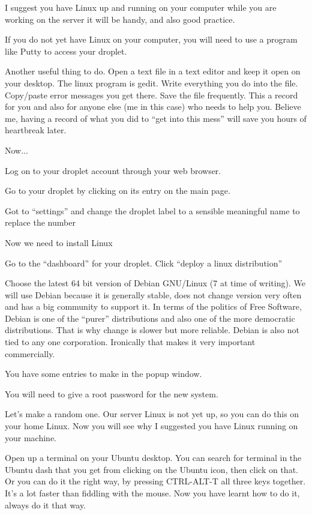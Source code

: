 \documentclass[12pt,a4paper]{article}
\begin{document}
I suggest you have Linux up and running on your computer while you are working on the server  it will be handy, and also good practice.

If you do not yet have Linux on your computer, you will need to use a program like Putty to access your droplet.

Another useful thing to do. Open a text file in a text editor and keep it open on your desktop. The linux program is gedit. Write everything you do into the file. Copy/paste error messages you get there. Save the file frequently. This a record for you and also for anyone else (me in this case) who needs to help you. Believe me, having a record of what you did to “get into this mess” will save you hours of heartbreak later. 

Now...

Log on to your droplet account through your web browser.

Go to your droplet by clicking on its entry on the main page.

Got to “settings” and change the droplet label to a sensible meaningful name to replace the number

Now we need to install Linux 

Go to the “dashboard” for your droplet. Click “deploy a linux distribution”

Choose the latest 64 bit version of Debian GNU/Linux (7 at time of writing). We will use Debian because it is generally stable, does not change version very often and has a big community to support it.  In terms of the politics of Free Software, Debian is one of the “purer” distributions and also one of the more democratic distributions. That is why change is slower but more reliable. Debian is also not tied to any one corporation. Ironically that makes it very important commercially.

You have some entries to make in the popup window.

You will need to give a root password for the new system. 

Let’s make a random one. Our server Linux is not yet up, so you can do this on your home Linux. Now you will see why I suggested you have Linux running on your machine.

Open up a terminal on your Ubuntu desktop. You can search for terminal in the Ubuntu dash that you get from clicking on the Ubuntu icon, then click on that. Or you can do it the right way, by pressing CTRL-ALT-T all three keys together. It’s a lot faster than fiddling with the mouse. Now you have learnt how to do it, always do it that way.  
\end{document}
